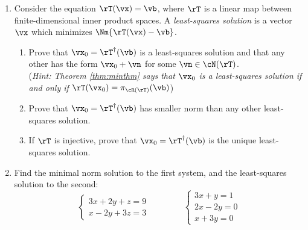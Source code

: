 \begin{exercises}
\begin{enumerate}
  \item Consider the equation $\rT(\vx)=\vb$, where $\rT$ is a linear map between finite-dimensional inner product spaces. A \emph{least-squares solution} is a vector $\vx$ which minimizes $\Nm{\rT(\vx)-\vb}$.
  \begin{enumerate}
    \item Prove that $\vx_0=\rT^\dag(\vb)$ is a least-squares solution and that any other has the form $\vx_0+\vn$ for some $\vn\in\cN(\rT)$.\\
		(\emph{Hint: Theorem \ref{thm:minthm} says that $\vx_0$ is a least-squares solution if and only if $\rT(\vx_0)=\pi_{\cR(\rT)}(\vb)$})
    \item Prove that $\vx_0=\rT^\dag(\vb)$ has smaller norm than any other least-squares solution.
		\item If $\rT$ is injective, prove that $\vx_0=\rT^\dag(\vb)$ is the unique least-squares solution.
	\end{enumerate}

	
		
	\item Find the minimal norm solution to the first system, and the least-squares solution to the second:
	\[\begin{cases}
		3x+2y+z=9\\
		x-2y+3z=3
		\end{cases}
		\qquad\qquad
		\begin{cases}
		3x+y=1\\
		2x-2y=0\\
		x+3y=0
		\end{cases}\]
\end{enumerate}
\end{exercises}

\clearpage

